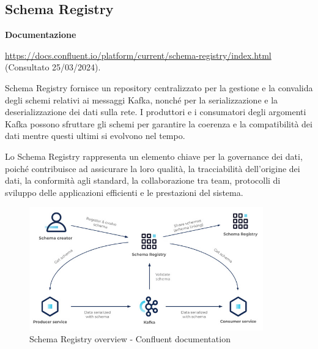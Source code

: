 \subsection{Schema Registry} \label{sec:schema_registry}

\textbf{Documentazione}

\href{https://docs.confluent.io/platform/current/schema-registry/index.html}{https://docs.confluent.io/platform/current/schema-registry/index.html} (Consultato 25/03/2024).

Schema Registry fornisce un repository centralizzato per la gestione e la convalida degli schemi relativi ai messaggi Kafka, nonché per la serializzazione e la deserializzazione dei dati sulla rete. I produttori e i consumatori degli argomenti Kafka possono sfruttare gli schemi per garantire la coerenza e la compatibilità dei dati mentre questi ultimi si evolvono nel tempo.

Lo Schema Registry rappresenta un elemento chiave per la governance dei dati, poiché contribuisce ad assicurare la loro qualità, la tracciabilità dell'origine dei dati, la conformità agli standard, la collaborazione tra team, protocolli di sviluppo delle applicazioni efficienti e le prestazioni del sistema.

\begin{figure}[H]
    \centering
    \includegraphics[width=0.9\textwidth]{../Images/SpecificaTecnica/schemaRegistry.jpg}
    \caption{Schema Registry overview - Confluent documentation}
    \label{fig:schemaReg}
\end{figure}

